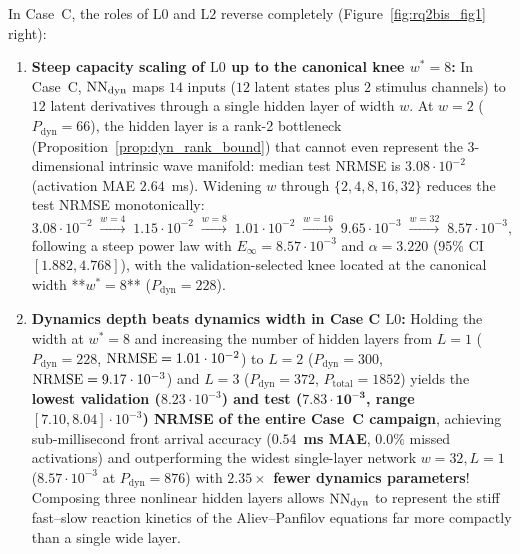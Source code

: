 In Case~C, the roles of $\mathrm{L0}$ and $\mathrm{L2}$ reverse completely (Figure~\ref{fig:rq2bis_fig1} right):
\begin{enumerate}[leftmargin=2em]
  \item \textbf{Steep capacity scaling of $\mathrm{L0}$ up to the canonical knee $w^* = 8$:} In Case~C, $\mathrm{NN}_{\mathrm{dyn}}$ maps $14$ inputs ($12$ latent states plus $2$ stimulus channels) to $12$ latent derivatives through a single hidden layer of width $w$. At $w=2$ ($P_{\mathrm{dyn}} = 66$), the hidden layer is a rank-2 bottleneck (Proposition~\ref{prop:dyn_rank_bound}) that cannot even represent the 3-dimensional intrinsic wave manifold: median test NRMSE is $3.08\cdot 10^{-2}$ (activation MAE $2.64$~ms). Widening $w$ through $\{2, 4, 8, 16, 32\}$ reduces the test NRMSE monotonically:
  \begin{equation}
    3.08\cdot 10^{-2} \;\xrightarrow{w=4}\; 1.15\cdot 10^{-2} \;\xrightarrow{w=8}\; 1.01\cdot 10^{-2} \;\xrightarrow{w=16}\; 9.65\cdot 10^{-3} \;\xrightarrow{w=32}\; 8.57\cdot 10^{-3},
  \end{equation}
  following a steep power law with $E_\infty = 8.57\cdot 10^{-3}$ and $\alpha = 3.220$ (95\% CI $[1.882, 4.768]$), with the validation-selected knee located at the canonical width **$w^* = 8$** ($P_{\mathrm{dyn}} = 228$).
  \item \textbf{Dynamics depth beats dynamics width in Case C $\mathrm{L0}$:} Holding the width at $w^* = 8$ and increasing the number of hidden layers from $L=1$ ($P_{\mathrm{dyn}} = 228$, $\mathrm{NRMSE} = 1.01\cdot 10^{-2}$) to $L=2$ ($P_{\mathrm{dyn}} = 300$, $\mathrm{NRMSE} = 9.17\cdot 10^{-3}$) and $L=3$ ($P_{\mathrm{dyn}} = 372$, $P_{\mathrm{total}} = 1852$) yields the \textbf{lowest validation ($8.23\cdot 10^{-3}$) and test ($\mathbf{7.83\cdot 10^{-3}}$, range $[7.10, 8.04]\cdot 10^{-3}$) NRMSE of the entire Case~C campaign}, achieving sub-millisecond front arrival accuracy ($\mathbf{0.54}$~\textbf{ms MAE}, $0.0\%$ missed activations) and outperforming the widest single-layer network $w=32, L=1$ ($8.57\cdot 10^{-3}$ at $P_{\mathrm{dyn}} = 876$) with \textbf{$2.35\times$ fewer dynamics parameters}! Composing three nonlinear hidden layers allows $\mathrm{NN}_{\mathrm{dyn}}$ to represent the stiff fast--slow reaction kinetics of the Aliev--Panfilov equations far more compactly than a single wide layer.

\end{enumerate}
